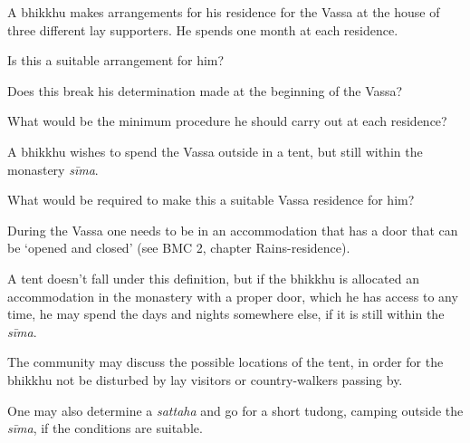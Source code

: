 \bigskip

A bhikkhu makes arrangements for his residence for the Vassa at the house of three different lay supporters. He spends one month at each residence.

Is this a suitable arrangement for him?

Does this break his determination made at the beginning of the Vassa?

What would be the minimum procedure he should carry out at each residence?

\bigskip

A bhikkhu wishes to spend the Vassa outside in a tent, but still within the monastery \emph{sīma}.

What would be required to make this a suitable Vassa residence for him?

\begin{solution}
  During the Vassa one needs to be in an accommodation that has a door that can
  be `opened and closed' (see BMC 2, chapter Rains-residence).

  A tent doesn't fall under this definition, but if the bhikkhu is allocated an
  accommodation in the monastery with a proper door, which he has access to any
  time, he may spend the days and nights somewhere else, if it is still within
  the \emph{sīma}.

  The community may discuss the possible locations of the tent, in order for the
  bhikkhu not be disturbed by lay visitors or country-walkers passing by.

  One may also determine a \emph{sattaha} and go for a short tudong, camping
  outside the \emph{sīma}, if the conditions are suitable.
\end{solution}
